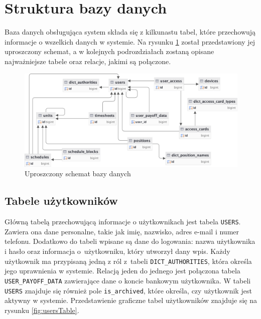 \section{Struktura bazy danych}

Baza danych obsługująca system składa się z kilkunastu tabel, które przechowują informacje o wszelkich danych w systemie. Na rysunku \ref{fig:dbDiagram} został przedstawiony jej uproszczony schemat, a w kolejnych podrozdziałach zostaną opisane najważniejsze tabele oraz relacje, jakimi są połączone.

\begin{figure}[H]
    \centering
    \includegraphics[width=\textwidth]{graf/dbDiagram.png}
    \caption{Uproszczony schemat bazy danych}
    \label{fig:dbDiagram}
\end{figure}

\subsection{Tabele użytkowników}

Główną tabelą przechowującą informacje o użytkownikach jest tabela \texttt{USERS}. Zawiera ona dane personalne, takie jak imię, nazwisko, adres e-mail i numer telefonu. Dodatkowo do tabeli wpisane są dane do logowania: nazwa użytkownika i hasło oraz informacja o~użytkowniku, który utworzył dany wpis. Każdy użytkownik ma przypisaną jedną z ról z~tabeli \texttt{DICT\_AUTHORITIES}, która określa jego uprawnienia w systemie. Relacją jeden do jednego jest połączona tabela \texttt{USER\_PAYOFF\_DATA} zawierające dane o koncie bankowym użytkownika. W tabeli \texttt{USERS} znajduje się również pole \texttt{is\_archived}, które określa, czy użytkownik jest aktywny w systemie. Przedstawienie graficzne tabel użytkowników znajduje się na rysunku \ref{fig:usersTable}.

